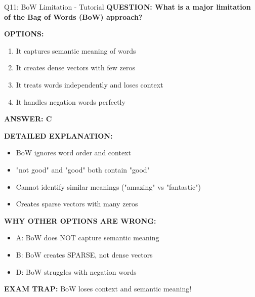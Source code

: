 \documentclass[8pt]{beamer}
\begin{document}
	\begin{frame}{Q11: BoW Limitation - Tutorial}
		\fontsize{6.5}{7.5}\selectfont
		\textbf{QUESTION: What is a major limitation of the Bag of Words (BoW) approach?}
		
		\vspace{0.1cm}
		\textbf{OPTIONS:}
		\begin{enumerate}
			\item It captures semantic meaning of words
			\item It creates dense vectors with few zeros
			\item It treats words independently and loses context
			\item It handles negation words perfectly
		\end{enumerate}
		
		\vspace{0.1cm}
		\textcolor{myblue}{\textbf{ANSWER: C}}
		
		\vspace{0.1cm}
		\textbf{DETAILED EXPLANATION:}
		\begin{itemize}
			\item BoW ignores word order and context
			\item "not good" and "good" both contain "good"
			\item Cannot identify similar meanings ("amazing" vs "fantastic")
			\item Creates sparse vectors with many zeros
		\end{itemize}
		
		\vspace{0.1cm}
		\textcolor{myred}{\textbf{WHY OTHER OPTIONS ARE WRONG:}}
		\begin{itemize}
			\item \textcolor{myred}{A:} BoW does NOT capture semantic meaning
			\item \textcolor{myred}{B:} BoW creates SPARSE, not dense vectors
			\item \textcolor{myred}{D:} BoW struggles with negation words
		\end{itemize}
		
		\textcolor{myred}{\textbf{EXAM TRAP:}} BoW loses \textcolor{myblue}{context and semantic meaning}!
	\end{frame}
	
\end{document}
